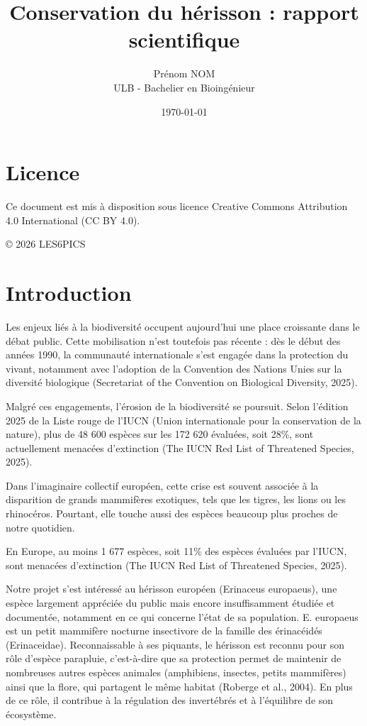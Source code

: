 \documentclass[a4paper,11pt]{article}
\title{Conservation du hérisson : rapport scientifique}
\author{Prénom NOM \\ ULB - Bachelier en Bioingénieur}
\date{\today}
\begin{document}
\maketitle

\section*{Licence}

Ce document est mis à disposition sous licence Creative Commons Attribution 4.0 International (CC BY 4.0).

© 2026 LES6PICS

\tableofcontents
\newpage

\linenumbers

\section{Introduction}
Les enjeux liés à la biodiversité occupent aujourd’hui une place croissante dans le débat public. Cette mobilisation n’est toutefois pas récente : dès le début des années 1990, la communauté internationale s’est engagée dans la protection du vivant, notamment avec l’adoption de la Convention des Nations Unies sur la diversité biologique (Secretariat of the Convention on Biological Diversity, 2025).

Malgré ces engagements, l’érosion de la biodiversité se poursuit. Selon l’édition 2025 de la Liste rouge de l’IUCN (Union internationale pour la conservation de la nature), plus de 48 600 espèces sur les 172 620 évaluées, soit 28\%, sont actuellement menacées d’extinction (The IUCN Red List of Threatened Species, 2025).

Dans l’imaginaire collectif européen, cette crise est souvent associée à la disparition de grands mammifères exotiques, tels que les tigres, les lions ou les rhinocéros. Pourtant, elle touche aussi des espèces beaucoup plus proches de notre quotidien.

En Europe, au moins 1 677 espèces, soit 11\% des espèces évaluées par l’IUCN, sont menacées d’extinction (The IUCN Red List of Threatened Species, 2025).

Notre projet s’est intéressé au hérisson européen (Erinaceus europaeus), une espèce largement appréciée du public mais encore insuffisamment étudiée et documentée, notamment en ce qui concerne l’état de sa population. E. europaeus est un petit mammifère nocturne insectivore de la famille des érinacéidés (Erinaceidae). Reconnaissable à ses piquants, le hérisson est reconnu pour son rôle d’espèce parapluie, c’est-à-dire que sa protection permet de maintenir de nombreuses autres espèces animales (amphibiens, insectes, petits mammifères) ainsi que la flore, qui partagent le même habitat (Roberge et al., 2004). En plus de ce rôle, il contribue à la régulation des invertébrés et à l’équilibre de son écosystème.
\end{document}
